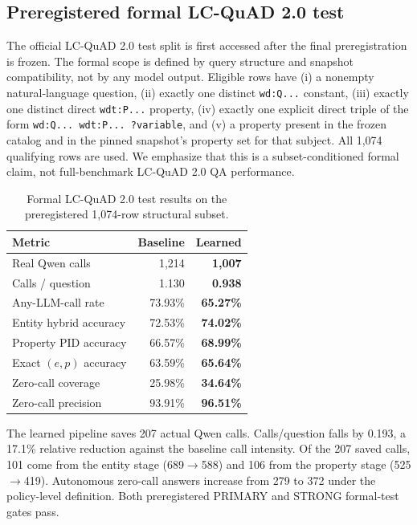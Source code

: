 \documentclass[10pt]{article}
\begin{document}
\subsection{Preregistered formal LC-QuAD 2.0 test}
The official LC-QuAD 2.0 test split is first accessed after the final preregistration is frozen. The formal scope is defined by query structure and snapshot compatibility, not by any model output. Eligible rows have (i) a nonempty natural-language question, (ii) exactly one distinct \texttt{wd:Q...} constant, (iii) exactly one distinct direct \texttt{wdt:P...} property, (iv) exactly one explicit direct triple of the form \texttt{wd:Q... wdt:P... ?variable}, and (v) a property present in the frozen catalog and in the pinned snapshot's property set for that subject. All 1,074 qualifying rows are used. We emphasize that this is a subset-conditioned formal claim, not full-benchmark LC-QuAD 2.0 QA performance.

\begin{table}[t]
\centering
\caption{Formal LC-QuAD 2.0 test results on the preregistered 1,074-row structural subset.}
\label{tab:test}
\begin{tabular}{lrr}
\toprule
Metric & Baseline & Learned \\
\midrule
Real Qwen calls & 1,214 & \textbf{1,007} \\
Calls / question & 1.130 & \textbf{0.938} \\
Any-LLM-call rate & 73.93\% & \textbf{65.27\%} \\
Entity hybrid accuracy & 72.53\% & \textbf{74.02\%} \\
Property PID accuracy & 66.57\% & \textbf{68.99\%} \\
Exact $(e,p)$ accuracy & 63.59\% & \textbf{65.64\%} \\
Zero-call coverage & 25.98\% & \textbf{34.64\%} \\
Zero-call precision & 93.91\% & \textbf{96.51\%} \\
\bottomrule
\end{tabular}
\end{table}

The learned pipeline saves 207 actual Qwen calls. Calls/question falls by 0.193, a 17.1\% relative reduction against the baseline call intensity. Of the 207 saved calls, 101 come from the entity stage (689$\rightarrow$588) and 106 from the property stage (525$\rightarrow$419). Autonomous zero-call answers increase from 279 to 372 under the policy-level definition. Both preregistered PRIMARY and STRONG formal-test gates pass.
\end{document}
